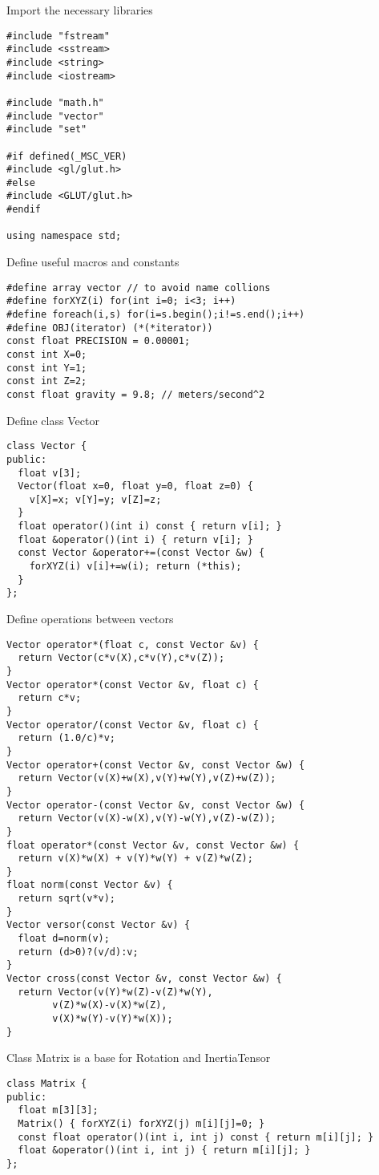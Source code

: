 
Import the necessary libraries
\begin{lstlisting}
#include "fstream"
#include <sstream>
#include <string>
#include <iostream>

#include "math.h"
#include "vector"
#include "set"

#if defined(_MSC_VER)
#include <gl/glut.h>
#else
#include <GLUT/glut.h>
#endif

using namespace std;
\end{lstlisting}

Define useful macros and constants
\begin{lstlisting}
#define array vector // to avoid name collions
#define forXYZ(i) for(int i=0; i<3; i++)
#define foreach(i,s) for(i=s.begin();i!=s.end();i++)
#define OBJ(iterator) (*(*iterator))
const float PRECISION = 0.00001;
const int X=0;
const int Y=1;
const int Z=2;
const float gravity = 9.8; // meters/second^2
\end{lstlisting}

Define class Vector
\begin{lstlisting}
class Vector {
public:
  float v[3];
  Vector(float x=0, float y=0, float z=0) {
    v[X]=x; v[Y]=y; v[Z]=z;
  }
  float operator()(int i) const { return v[i]; }
  float &operator()(int i) { return v[i]; }
  const Vector &operator+=(const Vector &w) {
    forXYZ(i) v[i]+=w(i); return (*this);
  }
};
\end{lstlisting}

Define operations between vectors
\begin{lstlisting}
Vector operator*(float c, const Vector &v) {
  return Vector(c*v(X),c*v(Y),c*v(Z));
}
Vector operator*(const Vector &v, float c) {
  return c*v;
}
Vector operator/(const Vector &v, float c) {
  return (1.0/c)*v;
}
Vector operator+(const Vector &v, const Vector &w) {
  return Vector(v(X)+w(X),v(Y)+w(Y),v(Z)+w(Z));
}
Vector operator-(const Vector &v, const Vector &w) {
  return Vector(v(X)-w(X),v(Y)-w(Y),v(Z)-w(Z));
}
float operator*(const Vector &v, const Vector &w) {
  return v(X)*w(X) + v(Y)*w(Y) + v(Z)*w(Z);
}
float norm(const Vector &v) {
  return sqrt(v*v);
}
Vector versor(const Vector &v) {
  float d=norm(v);
  return (d>0)?(v/d):v;
}
Vector cross(const Vector &v, const Vector &w) {
  return Vector(v(Y)*w(Z)-v(Z)*w(Y),
		v(Z)*w(X)-v(X)*w(Z),
		v(X)*w(Y)-v(Y)*w(X));
}
\end{lstlisting}

Class Matrix is a base for Rotation and InertiaTensor
\begin{lstlisting}
class Matrix {
public:
  float m[3][3];
  Matrix() { forXYZ(i) forXYZ(j) m[i][j]=0; }
  const float operator()(int i, int j) const { return m[i][j]; }
  float &operator()(int i, int j) { return m[i][j]; }
};
\end{lstlisting}


